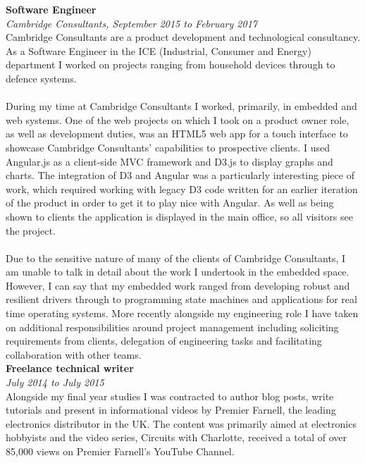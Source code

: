 \documentclass{article}
\begin{document}
\begin{flushleft}
\textbf{Software Engineer}\\
\textit{Cambridge Consultants, September 2015 to February 2017}\\[5pt]
Cambridge Consultants are a product development and technological consultancy. As a Software Engineer in the ICE (Industrial, Consumer and Energy) department I worked on projects ranging from household devices through to defence systems.

\paragraph{}During my time at Cambridge Consultants I worked, primarily, in embedded and web systems. One of the web projects on which I took on a product owner role, as well as development duties, was an HTML5 web app for a touch interface to showcase Cambridge Consultants' capabilities to prospective clients. I used Angular.js as a client-side MVC framework and D3.js to display graphs and charts. The integration of D3 and Angular was a particularly interesting piece of work, which required working with legacy D3 code written for an earlier iteration of the product in order to get it to play nice with Angular. As well as being shown to clients the application is displayed in the main office, so all visitors see the project.

\paragraph{}Due to the sensitive nature of many of the clients of Cambridge Consultants, I am unable to talk in detail about the work I undertook in the embedded space. However, I can say that my embedded work ranged from developing robust and resilient drivers through to programming state machines and applications for real time operating systems. More recently alongside my engineering role I have taken on additional responsibilities around project management including soliciting requirements from clients, delegation of engineering tasks and facilitating collaboration with other teams.\\[10pt]

\textbf{Freelance technical writer}\\
\textit{July 2014 to July 2015}\\[5pt]
Alongside my final year studies I was contracted to author blog posts, write tutorials and present in informational videos by Premier Farnell, the leading electronics distributor in the UK. The content was primarily aimed at electronics hobbyists and the video series, Circuits with Charlotte, received a total of over 85,000 views on Premier Farnell's YouTube Channel.


\end{flushleft}
\end{document}
